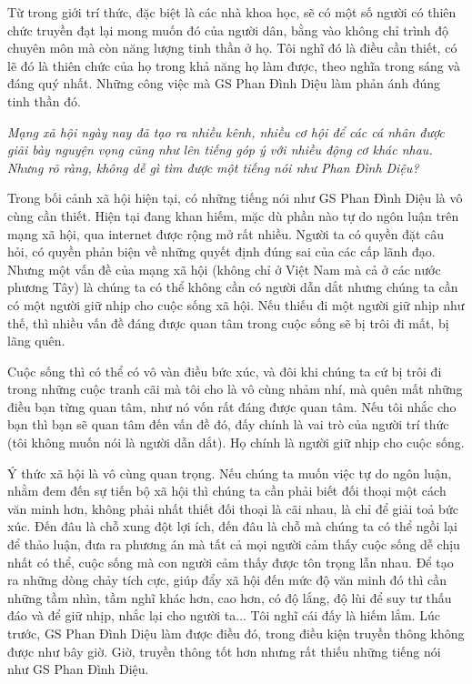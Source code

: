 Từ trong giới trí thức, đặc biệt là các nhà khoa học, sẽ có một số người có thiên chức truyền  đạt lại mong muốn đó của người dân, bằng vào không chỉ trình độ chuyên môn mà còn năng lượng tinh thần ở họ. Tôi nghĩ đó là điều cần thiết, có lẽ đó là thiên chức của họ trong khả năng họ làm được, theo nghĩa trong sáng và đáng quý nhất. Những công việc mà GS Phan Đình Diệu làm phản ánh đúng tinh thần đó.

\emph{
Mạng xã hội ngày nay đã tạo ra nhiều kênh, nhiều cơ hội để các cá nhân được giãi bày nguyện vọng cũng như lên tiếng góp ý với nhiều động cơ khác nhau. Nhưng rõ ràng, không dễ gì tìm được một tiếng nói như Phan Đình Diệu?}

Trong bối cảnh xã hội hiện tại, có những tiếng nói như GS Phan Đình Diệu là vô cùng cần thiết. Hiện tại đang khan hiếm, mặc dù phần nào tự do ngôn luận trên mạng xã hội, qua internet được rộng mở rất nhiều. Người ta có quyền đặt câu hỏi, có quyền phản biện về những quyết định đúng sai của các cấp lãnh đạo. Nhưng một vấn đề của mạng xã hội (không chỉ ở Việt Nam mà cả ở các nước phương Tây) là chúng ta có thể không cần có người dẫn dắt nhưng chúng ta cần có một người giữ nhịp cho cuộc sống xã hội. Nếu thiếu đi một người giữ nhịp như thế, thì nhiều vấn đề đáng được quan tâm trong cuộc sống sẽ bị trôi đi mất, bị lãng quên. 

Cuộc sống thì có thể có vô vàn điều bức xúc, và đôi khi chúng ta cứ bị trôi đi trong những cuộc tranh cãi mà tôi cho là vô cùng nhảm nhí, mà quên mất những điều bạn từng quan tâm, như nó vốn rất đáng được quan tâm. Nếu tôi nhắc cho bạn thì bạn sẽ quan tâm đến vấn đề đó, đấy chính là vai trò của người trí thức (tôi không muốn nói là người dẫn dắt). Họ chính là người giữ nhịp cho cuộc sống. 

Ý thức xã hội là vô cùng quan trọng. Nếu chúng ta muốn việc tự do ngôn luận, nhằm đem đến sự tiến bộ xã hội thì chúng ta cần phải biết đối thoại một cách văn minh hơn, không phải nhất thiết đối thoại là cãi nhau, là chỉ để giải toả bức xúc. Đến đâu là chỗ xung đột lợi ích, đến đâu là chỗ mà chúng ta có thể ngồi lại để thảo luận, đưa ra phương án mà tất cả mọi người cảm thấy cuộc sống dễ chịu nhất có thể, cuộc sống mà con người cảm thấy được tôn trọng lẫn nhau. Để tạo ra những dòng chảy tích cực, giúp đẩy xã hội đến mức độ văn minh đó thì cần những tầm nhìn, tầm nghĩ khác hơn, cao hơn, có độ lắng, độ lùi để suy tư thấu đáo và để giữ nhịp, nhắc lại cho người ta...  Tôi nghĩ cái đấy là hiếm lắm. Lúc trước, GS Phan Đình Diệu làm được điều đó, trong điều kiện truyền thông không được như bây giờ. Giờ, truyền thông tốt hơn nhưng rất thiếu những tiếng nói như GS Phan Đình Diệu. 

